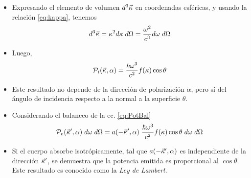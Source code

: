 \documentclass{sintefbeamer}
\begin{document}
\begin{frame}
    \begin{itemize}
        \item Expresando el elemento de volumen $d^3\Vec{\kappa}$ en coordenadas esféricas, y usando la relación \ref{eq:kappa}, tenemos
        \begin{equation}
            d^3\Vec{\kappa} = \kappa^2 d\kappa\hspace{1mm} d\Omega = \dfrac{\omega^2}{c^3}d\omega\hspace{1mm} d\Omega
            \label{eq:KappaEsf}
        \end{equation}\pause
        \item Luego,
        \begin{equation}
            \mathcal{P}_i(\Vec{\kappa},\alpha) = \dfrac{\hbar\omega^3}{c^2}f(\kappa) \cos{\theta} 
        \end{equation}\pause
        \item Este resultado no depende de la dirección de polarización $\alpha$, pero sí del ángulo de incidencia respecto a la normal a la superficie $\theta$.
    \end{itemize}
\end{frame}

\begin{frame}
    \begin{itemize}
        \item Considerando el balanceo de la ec. \ref{eq:PotBal}
        \begin{equation}
            \mathcal{P}_e(\Vec{\kappa}',\alpha)\hspace{1mm}d\omega\hspace{1mm}d\Omega = a(-\Vec{\kappa}',\alpha)\hspace{1mm}\dfrac{\hbar\omega^3}{c^2}f(\kappa) \cos{\theta}\hspace{1mm}d\omega\hspace{1mm}d\Omega
            \label{eq:PotExp}
        \end{equation}\pause
        \item Si el cuerpo absorbe isotrópicamente, tal que $a(-\Vec{\kappa}',\alpha)$ es independiente de la dirección $\Vec{\kappa}'$, se demuestra que la potencia emitida es proporcional al $\cos{\theta}$. Este resultado es conocido como la \emph{Ley de Lambert}.
    \end{itemize}
\end{frame}
\end{document}
